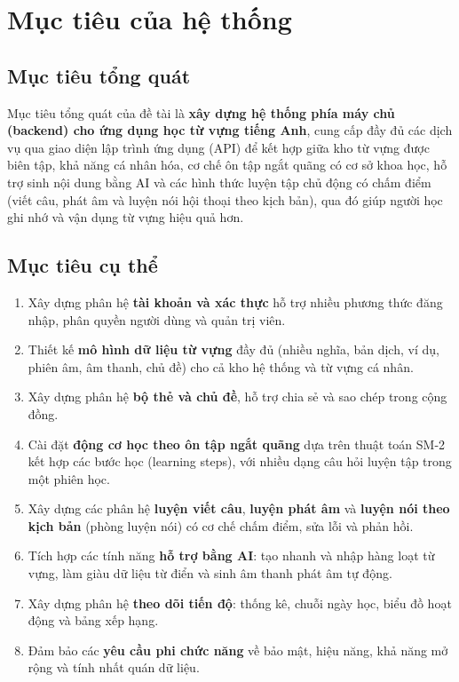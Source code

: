 \section{Mục tiêu của hệ thống}
\label{sec:muc-tieu}

\subsection{Mục tiêu tổng quát}

Mục tiêu tổng quát của đề tài là \textbf{xây dựng hệ thống phía máy chủ
(backend) cho ứng dụng học từ vựng tiếng Anh}, cung cấp đầy đủ các dịch vụ
qua giao diện lập trình ứng dụng (API) để kết hợp giữa kho từ vựng được
biên tập, khả năng cá nhân hóa, cơ chế ôn tập ngắt quãng có cơ sở khoa
học, hỗ trợ sinh nội dung bằng AI và các hình thức luyện tập chủ động có
chấm điểm (viết câu, phát âm và luyện nói hội thoại theo kịch bản), qua đó
giúp người học ghi nhớ và vận dụng từ vựng hiệu quả hơn.

\subsection{Mục tiêu cụ thể}

\begin{enumerate}
  \item Xây dựng phân hệ \textbf{tài khoản và xác thực} hỗ trợ nhiều
        phương thức đăng nhập, phân quyền người dùng và quản trị viên.
  \item Thiết kế \textbf{mô hình dữ liệu từ vựng} đầy đủ (nhiều nghĩa, bản
        dịch, ví dụ, phiên âm, âm thanh, chủ đề) cho cả kho hệ thống và từ
        vựng cá nhân.
  \item Xây dựng phân hệ \textbf{bộ thẻ và chủ đề}, hỗ trợ chia sẻ và sao
        chép trong cộng đồng.
  \item Cài đặt \textbf{động cơ học theo ôn tập ngắt quãng} dựa trên thuật
        toán SM-2 kết hợp các bước học (learning steps), với nhiều dạng
        câu hỏi luyện tập trong một phiên học.
  \item Xây dựng các phân hệ \textbf{luyện viết câu}, \textbf{luyện phát
        âm} và \textbf{luyện nói theo kịch bản} (phòng luyện nói) có cơ chế
        chấm điểm, sửa lỗi và phản hồi.
  \item Tích hợp các tính năng \textbf{hỗ trợ bằng AI}: tạo nhanh và nhập
        hàng loạt từ vựng, làm giàu dữ liệu từ điển và sinh âm thanh phát
        âm tự động.
  \item Xây dựng phân hệ \textbf{theo dõi tiến độ}: thống kê, chuỗi ngày
        học, biểu đồ hoạt động và bảng xếp hạng.
  \item Đảm bảo các \textbf{yêu cầu phi chức năng} về bảo mật, hiệu năng,
        khả năng mở rộng và tính nhất quán dữ liệu.
\end{enumerate}


